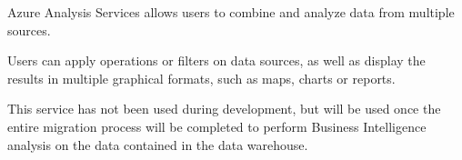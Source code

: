 Azure Analysis Services allows users to combine and analyze data from multiple sources.

Users can apply operations or filters on data sources, as well as display the results in multiple graphical formats, such as maps, charts or reports.

This service has not been used during development, but will be used once the entire migration process will be completed to perform Business Intelligence analysis on the data contained in the data warehouse.